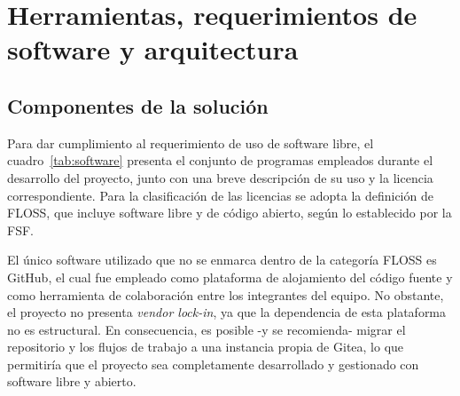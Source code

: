 \chapter{Herramientas, requerimientos de software y arquitectura}
\label{chp:4}

\section{Componentes de la solución}

Para dar cumplimiento al requerimiento de uso de software libre, el cuadro~\ref{tab:software} presenta el conjunto de programas empleados durante el desarrollo del proyecto, junto con una breve descripción de su uso y la licencia correspondiente. Para la clasificación de las licencias se adopta la definición de \ac{FLOSS}, que incluye software libre y de código abierto, según lo establecido por la \ac{FSF}\cite{gnu_free_sw}.

El único software utilizado que no se enmarca dentro de la categoría \acs{FLOSS} es GitHub, el cual fue empleado como plataforma de alojamiento del código fuente y como herramienta de colaboración entre los integrantes del equipo. No obstante, el proyecto no presenta \textit{vendor lock-in}, ya que la dependencia de esta plataforma no es estructural. En consecuencia, es posible -y se recomienda- migrar el repositorio y los flujos de trabajo a una instancia propia de Gitea\cite{gitea_about}, lo que permitiría que el proyecto sea completamente desarrollado y gestionado con software libre y abierto.

